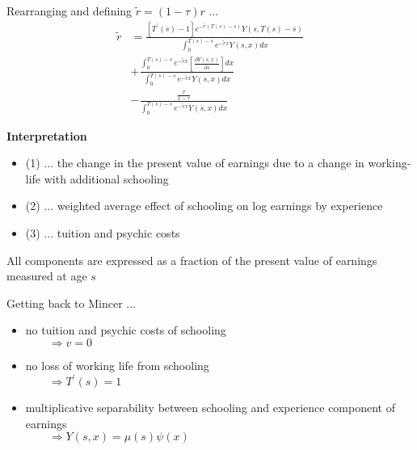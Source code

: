\begin{frame}
Rearranging and defining $\tilde{r} = (1 - \tau)r$ ...
\begin{align}
\tilde{r} & = \frac{[T^\prime(s) - 1]e^{-\tilde{r}(T(s) - s)}Y(s, T(s) - s )}{\int_0^{T(s) - s} e^{-\tilde{r}x}Y(s, x) dx} \\
          & + \frac{\int_0^{T(s) - s}e^{-\tilde{r}x}\left[\frac{\partial Y(s, x)}{\partial s}\right] dx}{\int_0^{T(s) - s}e^{-\tilde{r}x}Y(s, x) dx} \\
          & - \frac{\frac{v}{1-\tau}}{\int_0^{T(s) - s}e^{-\tilde{r}x}Y(s, x)dx}
\end{align}
\end{frame}
\begin{frame}\textbf{Interpretation}\vspace{0.3cm}
\begin{itemize}\setlength\itemsep{1em}
\item (1) ... the change in the present value of earnings due to a change in working-life with additional schooling
\item (2) ... weighted average effect of schooling on log earnings by experience
\item (3) ... tuition and psychic costs 
\end{itemize}
All components are expressed as a fraction of the present value of earnings measured at age $s$
\end{frame}
\begin{frame}
Getting back to Mincer ...
\begin{itemize}
\item no tuition and psychic costs of schooling \\
    $\qquad\Rightarrow v = 0$
\item no loss of working life from schooling \\
    $\qquad\Rightarrow T^\prime(s) = 1$
\item multiplicative separability between schooling and experience component of earnings \\
    $\qquad\Rightarrow Y(s, x) = \mu(s)\psi(x)$
\end{itemize}
\end{frame}
